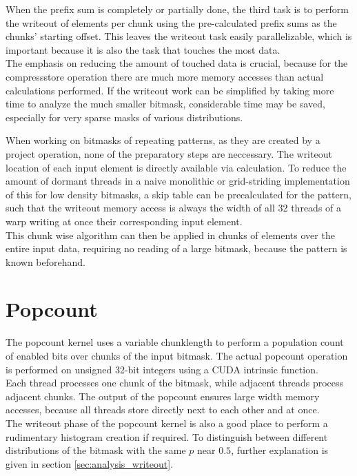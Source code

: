 \documentclass{tudscrreprt}
\begin{document}
		When the prefix sum is completely or partially done, the third task is to perform the writeout of elements per chunk using the pre-calculated prefix sums as the chunks' starting offset. This leaves the writeout task easily parallelizable, which is important because it is also the task that touches the most data. \\
		
		The emphasis on reducing the amount of touched data is crucial, because for the compressstore operation there are much more memory accesses than actual calculations performed. If the writeout work can be simplified by taking more time to analyze the much smaller bitmask, considerable time may be saved, especially for very sparse masks of various distributions.
	
		When working on bitmasks of repeating patterns, as they are created by a project operation, none of the preparatory steps are neccessary. The writeout location of each input element is directly available via calculation. To reduce the amount of dormant threads in a naive monolithic or grid-striding implementation of this for low density bitmasks, a skip table can be precalculated for the pattern, such that the writeout memory access is always the width of all 32 threads of a warp writing at once their corresponding input element. \cite{cuda_gridstriding} \\
		This chunk wise algorithm can then be applied in chunks of elements over the entire input data, requiring no reading of a large bitmask, because the pattern is known beforehand. \\
	
		\section{Popcount}
			The popcount kernel uses a variable chunklength to perform a population count of enabled bits over chunks of the input bitmask. The actual popcount operation is performed on unsigned 32-bit integers using a CUDA intrinsic function. \\
			Each thread processes one chunk of the bitmask, while adjacent threads process adjacent chunks. The output of the popcount ensures large width memory accesses, because all threads store directly next to each other and at once. \\
			
			The writeout phase of the popcount kernel is also a good place to perform a rudimentary histogram creation if required. To distinguish between different distributions of the bitmask with the same $p$ near $0.5$, further explanation is given in section \ref{sec:analysis_writeout}. \\
		
\end{document}
